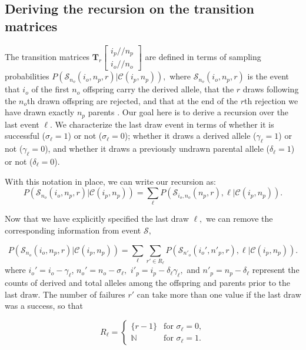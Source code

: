\documentclass[review]{elsarticle}
\newcommand{\dslash}{/\!\!/}
\newcommand{\Coalc}[4]{\begin{bmatrix}#1\dslash #2 \\ #3\dslash #4 \end{bmatrix}}
\newcommand{\CC}{\mathcal{C}}
\newcommand{\ms}{\mathcal{S}}
\begin{document}
\subsection{Deriving the recursion on the transition matrices}
\label{subsec_apx_tpm_deriv}

The transition matrices $\mathbf{T}_{r}\Coalc{i_p}{n_p}{i_o}{n_o}$ are defined in terms of sampling
probabilities $P(\ms_{n_o}(i_o, n_p, r) | \CC{(i_p,n_p)} ),$ where $\ms_{n_o}(i_o,n_p, r)$ is the
event that $i_o$ of the first $n_o$ offspring carry the derived allele, that the $r$
draws following the $n_o$th drawn offspring are rejected, and that at the end of the $r$th
rejection we have drawn exactly $n_p$ parents . Our goal here is to derive a recursion
over the last event $\ell$. We characterize the last draw event in terms of whether it is
successful ($\sigma_\ell=1$) or not ($\sigma_\ell=0$); whether it draws a derived allele
($\gamma_\ell=1$) or not ($\gamma_\ell=0$), and whether it draws a previously undrawn parental
allele ($\delta_\ell=1$) or not ($\delta_\ell=0$).

With this notation in place, we can write our recursion as: 
 \begin{equation}
  P( \ms_{n_o}(i_o, n_p, r) | \CC{(i_p,n_p)} ) = \sum_\ell P( \ms_{i_o, n_o}(n_p, r),\ell | \CC(i_p,n_p) ) . 
 \end{equation}

Now that we have explicitly specified the last draw $\ell,$ we can remove the corresponding
information from event $\ms,$ 

\begin{equation}
  P(\ms_{n_o}(i_o, n_p, r) | \CC{(i_p,n_p)} ) = \sum_\ell \sum_{r' \in R_\ell} P(\ms_{n'_o}(i_o',
  n'_p, r),\ell | \CC{(i_p,n_p)} ) . 
\end{equation}
where $i_o' = i_o-\gamma_\ell$,  $n_o' = n_o-\sigma_\ell,$ $i'_p= i_p - \delta_\ell \gamma_\ell,$  and $n'_p  = n_p - \delta_\ell$ represent the 
counts of derived and total alleles among the offspring and parents prior to the last draw. 
 The number of failures $r'$ can take more than one value if the last draw was a success,
so that 

\begin{equation}
  R_\ell = \begin{cases} 
    \{r-1\}    & \text{for } \sigma_\ell = 0, \\
    \mathbb{N} & \text{for } \sigma_\ell = 1.
  \end{cases}
\end{equation} 
\end{document}
